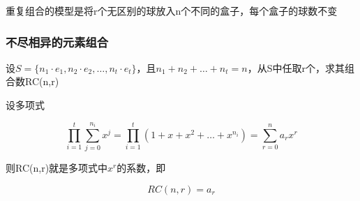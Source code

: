 \documentclass{article}
\begin{document}
重复组合的模型是将r个无区别的球放入n个不同的盒子，每个盒子的球数不变

\subsubsection{不尽相异的元素组合}

设$S=\{n_1\cdot e_1,n_2\cdot e_2,\dots,n_t\cdot e_t\}$，且$n_1+n_2+\dots+n_t = n$，从S中任取r个，求其组合数RC(n,r)

设多项式

$$
\prod^t_{i=1} \sum^{n_i}_{j=0} x^j =  \prod^t_{i=1}(1+x+x^2+\dots+x^{n_i}) = \sum^n_{r=0}a_rx^r
$$

则RC(n,r)就是多项式中$x^r$的系数，即

$$
RC(n,r) = a_r
$$
\end{document}
